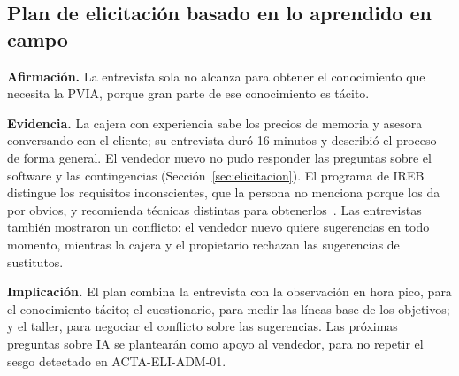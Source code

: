 \subsection{Plan de elicitación basado en lo aprendido en campo}

\textbf{Afirmación.} La entrevista sola no alcanza para obtener el conocimiento que necesita la PVIA, porque gran parte de ese conocimiento es tácito.

\textbf{Evidencia.} La cajera con experiencia sabe los precios de memoria y asesora conversando con el cliente; su entrevista duró 16 minutos y describió el proceso de forma general. El vendedor nuevo no pudo responder las preguntas sobre el software y las contingencias (Sección~\ref{sec:elicitacion}). El programa de IREB distingue los requisitos inconscientes, que la persona no menciona porque los da por obvios, y recomienda técnicas distintas para obtenerlos~\cite{ireb2026}. Las entrevistas también mostraron un conflicto: el vendedor nuevo quiere sugerencias en todo momento, mientras la cajera y el propietario rechazan las sugerencias de sustitutos.

\textbf{Implicación.} El plan combina la entrevista con la observación en hora pico, para el conocimiento tácito; el cuestionario, para medir las líneas base de los objetivos; y el taller, para negociar el conflicto sobre las sugerencias. Las próximas preguntas sobre IA se plantearán como apoyo al vendedor, para no repetir el sesgo detectado en ACTA-ELI-ADM-01.
